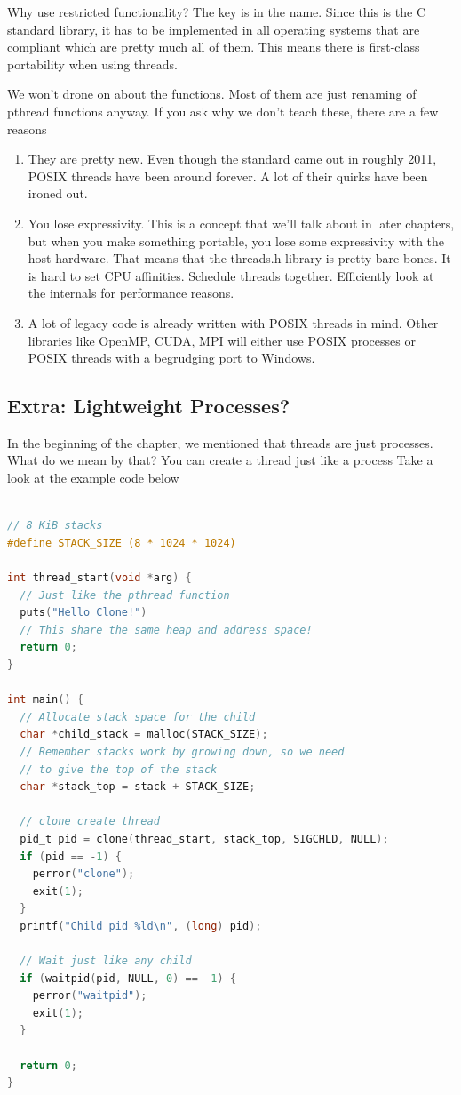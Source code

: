 Why use restricted functionality?
The key is in the name.
Since this is the C standard library, it has to be implemented in all operating systems that are compliant which are pretty much all of them.
This means there is first-class portability when using threads.

We won't drone on about the functions.
Most of them are just renaming of pthread functions anyway.
If you ask why we don't teach these, there are a few reasons

\begin{enumerate}
\item They are pretty new. Even though the standard came out in roughly 2011, POSIX threads have been around forever.
  A lot of their quirks have been ironed out.
\item You lose expressivity.
  This is a concept that we'll talk about in later chapters, but when you make something portable, you lose some expressivity with the host hardware.
  That means that the threads.h library is pretty bare bones.
  It is hard to set CPU affinities.
  Schedule threads together.
  Efficiently look at the internals for performance reasons.
\item A lot of legacy code is already written with POSIX threads in mind.
  Other libraries like OpenMP, CUDA, MPI will either use POSIX processes or POSIX threads with a begrudging port to Windows.
\end{enumerate}

\subsection{Extra: Lightweight Processes?}

In the beginning of the chapter, we mentioned that threads are just processes.
What do we mean by that?
You can create a thread just like a process
Take a look at the example code below

\begin{lstlisting}[language=C]

// 8 KiB stacks
#define STACK_SIZE (8 * 1024 * 1024)

int thread_start(void *arg) {
  // Just like the pthread function
  puts("Hello Clone!")
  // This share the same heap and address space!
  return 0;
}

int main() {
  // Allocate stack space for the child
  char *child_stack = malloc(STACK_SIZE);
  // Remember stacks work by growing down, so we need
  // to give the top of the stack
  char *stack_top = stack + STACK_SIZE;

  // clone create thread
  pid_t pid = clone(thread_start, stack_top, SIGCHLD, NULL);
  if (pid == -1) {
    perror("clone");
    exit(1);
  }
  printf("Child pid %ld\n", (long) pid);

  // Wait just like any child
  if (waitpid(pid, NULL, 0) == -1) {
    perror("waitpid");
    exit(1);
  }

  return 0;
}
\end{lstlisting}

